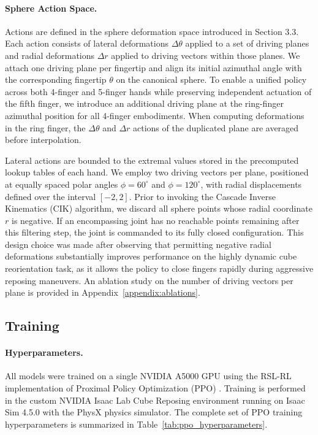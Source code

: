 \paragraph{Sphere Action Space.}
Actions are defined in the sphere deformation space introduced in Section 3.3. Each action consists of lateral deformations $\Delta\theta$ applied to a set of driving planes and radial deformations $\Delta r$ applied to driving vectors within those planes. We attach one driving plane per fingertip and align its initial azimuthal angle with the corresponding fingertip $\theta$ on the canonical sphere. To enable a unified policy across both 4-finger and 5-finger hands while preserving independent actuation of the fifth finger, we introduce an additional driving plane at the ring-finger azimuthal position for all 4-finger embodiments. When computing deformations in the ring finger, the $\Delta\theta$ and $\Delta r$ actions of the duplicated plane are averaged before interpolation.

Lateral actions are bounded to the extremal values stored in the precomputed lookup tables of each hand. We employ two driving vectors per plane, positioned at equally spaced polar angles $\phi = 60^\circ$ and $\phi = 120^\circ$, with radial displacements defined over the interval $[-2, 2]$. Prior to invoking the Cascade Inverse Kinematics (CIK) algorithm, we discard all sphere points whose radial coordinate $r$ is negative. If an encompassing joint has no reachable points remaining after this filtering step, the joint is commanded to its fully closed configuration. This design choice was made after observing that permitting negative radial deformations substantially improves performance on the highly dynamic cube reorientation task, as it allows the policy to close fingers rapidly during aggressive reposing maneuvers. An ablation study on the number of driving vectors per plane is provided in Appendix~\ref{appendix:ablations}.

\subsection{Training}
\label{appendix:training_rl}

\paragraph{Hyperparameters.}
All models were trained on a single NVIDIA A5000 GPU using the RSL-RL implementation of Proximal Policy Optimization (PPO) \cite{schwarke2025rslrl}. Training is performed in the custom NVIDIA Isaac Lab Cube Reposing environment \cite{mittal2025isaaclab} running on Isaac Sim 4.5.0 with the PhysX physics simulator. The complete set of PPO training hyperparameters is summarized in Table~\ref{tab:ppo_hyperparameters}.

